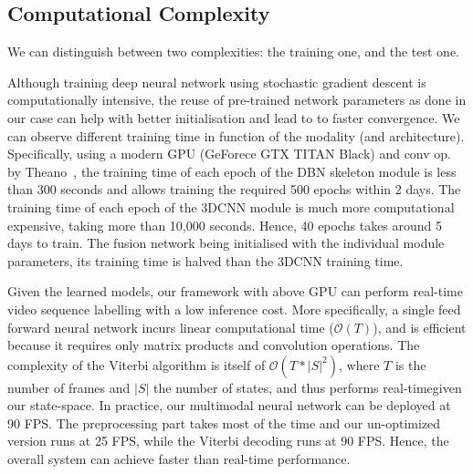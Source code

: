\subsection{Computational Complexity}
\label{sec:ComputationalComplexity}

We can distinguish between two complexities: the training one, and the test one.

%
Although training deep neural network using stochastic gradient descent is computationally intensive,
the reuse of pre-trained network parameters as done in our case can help with  better initialisation and lead to to faster convergence.
%
We can observe different training time in function of the modality (and architecture).
%
Specifically, using a modern GPU (GeForece GTX TITAN Black) and conv op. by Theano~\cite{Bastien-Theano-2012},
the training time of each epoch of the DBN skeleton module is less than 300 seconds and allows training the required 500 epochs within 2 days.
%
The training time of each epoch of the 3DCNN \RGBD  module is much more computational expensive,
taking more than 10,000 seconds.
Hence, 40 epochs takes around 5 days to train.
%
The fusion network being initialised with the individual module parameters, its training time is halved than the 3DCNN training time.


%
Given the learned models, our framework with above GPU can perform real-time video sequence labelling with a low inference cost.
%
More specifically, a single feed forward neural network incurs linear computational time ($\mathcal{O}(T)$),
and is efficient because it requires only matrix products and convolution operations.
The complexity of the Viterbi algorithm is itself of $\mathcal{O} (T* |S|^2)$, where
$T$ is the number of frames and $|S|$ the number of states, and thus performs real-timegiven our state-space.
In practice, our multimodal neural network can be deployed at 90 FPS.
The preprocessing part takes most of the time and our un-optimized version runs at 25 FPS, while the
 Viterbi decoding  runs at 90 FPS. Hence, the overall system can achieve faster than real-time performance.


\endinput
